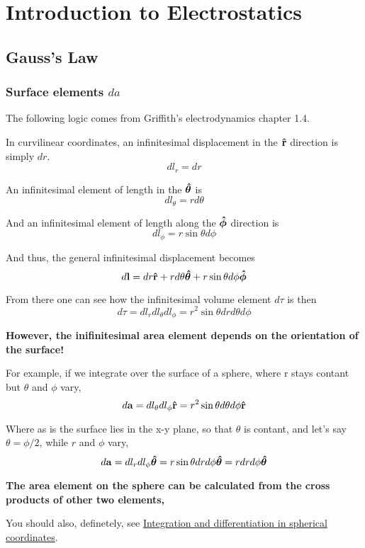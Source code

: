 \section{Introduction to Electrostatics}

\subsection{Gauss's Law}


\subsubsection{Surface elements $da$}

The following logic comes from Griffith's electrodynamics chapter 1.4.

In curvilinear coordinates, an infinitesimal displacement in the $\boldsymbol{\mathbf{\hat{r}}}$ direction is
simply $dr$.
$$
dl_r = dr
$$

An infinitesimal element of length in the $\boldsymbol{\mathbf{\hat{\theta}}}$ is
$$
dl_\theta = r d\theta
$$

And an infinitesimal element of length along the $\boldsymbol{\mathbf{\hat{\phi}}}$ direction
is
$$
dl_\phi = r \sin\theta d\phi
$$

And thus, the general infinitesimal displacement becomes
$$
d\boldsymbol{\mathbf{l}} =
dr \boldsymbol{\mathbf{\hat{r}}}
+ r d\theta \boldsymbol{\mathbf{\hat{\theta}}}
+ r \sin\theta d\phi \boldsymbol{\mathbf{\hat{\phi}}}
$$

From there one can see how the infinitesimal volume element $d\tau$ is then
$$
d\tau = dl_r dl_\theta dl_\phi =
r^2 \sin\theta dr d\theta d\phi
$$

\textbf{However, the inifinitesimal area element depends on the orientation of the surface!}

For example, if we integrate over the surface of a sphere, where r stays contant but $\theta$
and $\phi$ vary,
$$
d\boldsymbol{\mathbf{a}} = dl_\theta dl_\phi \boldsymbol{\mathbf{\hat{r}}} = r^2 \sin\theta d\theta d\phi \boldsymbol{\mathbf{\hat{r}}}
$$

Where as is the surface lies in the x-y plane, so that $\theta$ is contant, and let's say $\theta = \phi/2$,
while $r$ and $\phi$ vary,
$$
d\boldsymbol{\mathbf{a}} = dl_r dl_\phi \boldsymbol{\mathbf{\hat{\theta}}}
= r \sin\theta dr d\phi \boldsymbol{\mathbf{\hat{\theta}}}
= r dr d\phi \boldsymbol{\mathbf{\hat{\theta}}}
$$

\textbf{The area element on the sphere can be calculated from the cross products of other two elements,}

You should also, definetely, see
\href{https://en.wikipedia.org/wiki/Spherical_coordinate_system#Integration_and_differentiation_in_spherical_coordinates}{Integration and differentiation in spherical coordinates}.


